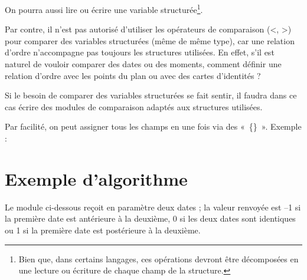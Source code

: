 
	On pourra aussi lire ou écrire une variable structurée\footnote{Bien que, dans certains
	langages, ces opérations devront être décomposées en une lecture ou
	écriture de chaque champ de la structure.}.


	Par contre, il n’est pas autorisé d’utiliser
	les opérateurs de comparaison ({\textless}, {\textgreater}) pour
	comparer des variables structurées (même de même type), car une
	relation d’ordre n’accompagne pas toujours les structures utilisées. En
	effet, s’il est naturel de vouloir comparer des dates ou des moments,
	comment définir une relation d’ordre avec les points du plan ou avec
	des cartes d’identités ?

	Si le besoin de comparer des variables
	structurées se fait sentir, il faudra dans ce cas écrire des modules de
	comparaison adaptés aux structures utilisées.

	Par facilité, on peut assigner tous les champs en une fois via des
	«~\{\}~». Exemple :


\section{Exemple d’algorithme}

	Le module ci-dessous reçoit en paramètre deux dates ; la valeur renvoyée
	est –1 si la première date est antérieure à la deuxième, 0 si les deux
	dates sont identiques ou 1 si la première date est postérieure à la
	deuxième.


